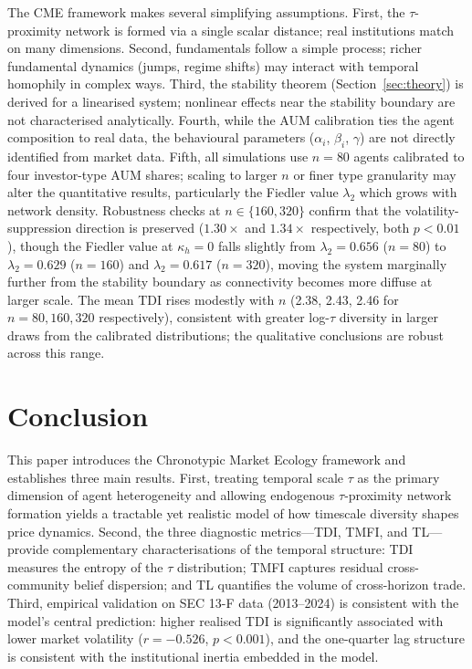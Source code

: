 \documentclass[10pt,twocolumn]{article}
\begin{document}
The CME framework makes several simplifying assumptions.
First, the $\tau$-proximity network is formed via a single scalar distance;
real institutions match on many dimensions.
Second, fundamentals follow a simple process; richer fundamental dynamics
(jumps, regime shifts) may interact with temporal homophily in complex ways.
Third, the stability theorem (Section~\ref{sec:theory}) is derived for
a linearised system; nonlinear effects near the stability boundary are
not characterised analytically.
Fourth, while the AUM calibration ties the agent composition to real data,
the behavioural parameters ($\alpha_i$, $\beta_i$, $\gamma$) are not
directly identified from market data.
Fifth, all simulations use $n = 80$ agents calibrated to four investor-type AUM shares; scaling to larger $n$ or finer type granularity may alter the quantitative results, particularly the Fiedler value $\lambda_2$ which grows with network density.
Robustness checks at $n \in \{160, 320\}$ confirm that the volatility-suppression direction is preserved ($1.30\times$ and $1.34\times$ respectively, both $p < 0.01$), though the Fiedler value at $\kappa_h = 0$ falls slightly from $\lambda_2 = 0.656$ ($n = 80$) to $\lambda_2 = 0.629$ ($n = 160$) and $\lambda_2 = 0.617$ ($n = 320$), moving the system marginally further from the stability boundary as connectivity becomes more diffuse at larger scale.
The mean TDI rises modestly with $n$ (2.38, 2.43, 2.46 for $n = 80, 160, 320$ respectively), consistent with greater log-$\tau$ diversity in larger draws from the calibrated distributions; the qualitative conclusions are robust across this range.

\section{Conclusion}
\label{sec:conclusion}

This paper introduces the Chronotypic Market Ecology framework and establishes
three main results. First, treating temporal scale $\tau$ as the primary
dimension of agent heterogeneity and allowing endogenous $\tau$-proximity
network formation yields a tractable yet realistic model of how timescale
diversity shapes price dynamics. Second, the three diagnostic metrics---TDI,
TMFI, and TL---provide complementary characterisations of the temporal
structure: TDI measures the entropy of the $\tau$ distribution; TMFI
captures residual cross-community belief dispersion; and TL quantifies the
volume of cross-horizon trade.
Third, empirical validation on SEC 13-F data
(2013--2024) is consistent with the model's central prediction: higher realised TDI
is significantly associated with lower market volatility ($r = -0.526$,
$p < 0.001$), and the one-quarter lag structure is consistent with the
institutional inertia embedded in the model.
\end{document}
